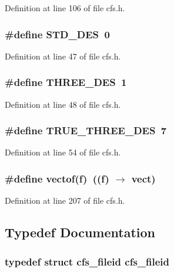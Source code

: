 Definition at line 106 of file cfs.h.
\subsubsection{\setlength{\rightskip}{0pt plus 5cm}\#define STD\_\-DES\ 0}\label{cfs_8h_a7}




Definition at line 47 of file cfs.h.
\subsubsection{\setlength{\rightskip}{0pt plus 5cm}\#define THREE\_\-DES\ 1}\label{cfs_8h_a8}




Definition at line 48 of file cfs.h.
\subsubsection{\setlength{\rightskip}{0pt plus 5cm}\#define TRUE\_\-THREE\_\-DES\ 7}\label{cfs_8h_a14}




Definition at line 54 of file cfs.h.
\subsubsection{\setlength{\rightskip}{0pt plus 5cm}\#define vectof(f)\ ((f) $\rightarrow$ {\bf vect})}\label{cfs_8h_a23}




Definition at line 207 of file cfs.h.

\subsection{Typedef Documentation}
\subsubsection{\setlength{\rightskip}{0pt plus 5cm}typedef struct {\bf cfs\_\-fileid}  {\bf cfs\_\-fileid}}\label{cfs_8h_a26}


